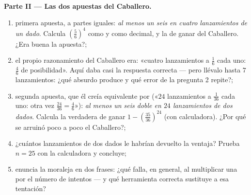 \begin{problem}
\medskip
\noindent\textbf{Parte II --- Las dos apuestas del Caballero.}
\begin{enumerate}[resume]
  \item primera apuesta, a partes iguales: \emph{al menos un seis en cuatro
        lanzamientos de un dado}. Calcula
        $\left(\frac56\right)^4$ como  y como decimal,
        y la  de ganar del Caballero. ¿Era buena la
        apuesta?;
  \item el propio razonamiento del Caballero era: «cuatro lanzamientos a
        $\frac16$ cada uno: $\frac46$ de posibilidad». Aquí daba casi
        la respuesta correcta --- pero llévalo hasta $7$ lanzamientos: ¿qué
        absurdo produce y qué error de la pregunta 2
        repite?;
  \item segunda apuesta, que él creía equivalente por 
        («$24$ lanzamientos a $\frac1{36}$ cada uno: otra vez
        $\frac{24}{36} = \frac46$»): \emph{al menos un
        seis doble en $24$ lanzamientos de dos dados}. Calcula la
         verdadera de ganar $1 - \left(\frac{35}{36}\right)^{24}$
        (con calculadora). ¿Por qué se arruinó poco a poco el Caballero?;
  \item ¿cuántos lanzamientos de dos dados le habrían devuelto la
        ventaja? Prueba $n = 25$ con la calculadora y
        concluye;
  \item enuncia la moraleja en dos frases: ¿qué falla, en
        general, al multiplicar una  por el número de
        intentos --- y qué herramienta correcta sustituye a esa
        tentación?
\end{enumerate}


\end{problem}
